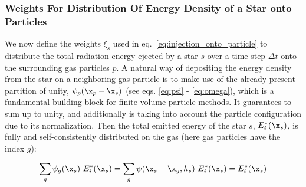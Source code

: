 \subsubsection{Weights For Distribution Of Energy Density of a Star onto
Particles}\label{chap:injection-weights}

We now define the weights $\xi_s$ used in eq.~\ref{eq:injection_onto_particle} to distribute the
total radiation energy ejected by a star $s$ over a time step $\Delta t$ onto the surrounding gas
particles $p$.
A natural way of depositing the energy density from the star on a neighboring gas particle is to
make use of the already present partition of unity, $\psi_p(\x_p - \x_s)$ (see eqs. \ref{eq:psi} -
\ref{eq:omega}), which is a fundamental building block for finite volume particle methods. It
guarantees to sum up to unity, and additionally is taking into account the particle configuration
due to its normalization.
%
%
%
%
%
%
Then the total emitted energy of the star $s$, $E^*_i(\x_s)$, is fully and self-consistently
distributed on the gas (here gas particles have the index $g$):

\begin{align}
	\sum_g \psi_g(\x_s)\  E_i^*(\x_s) = \sum_g \psi(\x_s - \x_g, h_s) \ E_i^*(\x_s) = E_i^*(\x_s)
\end{align}


